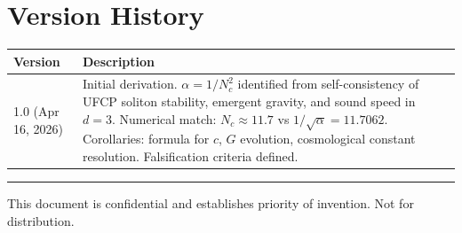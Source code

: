 \documentclass[11pt, a4paper]{article}
\begin{document}
\section{Version History}

\begin{center}
\begin{tabular}{@{}lp{10.5cm}@{}}
\toprule
\textbf{Version} & \textbf{Description} \\
\midrule
1.0 (Apr 16, 2026) & Initial derivation. $\alpha = 1/N_c^2$
  identified from self-consistency of UFCP soliton stability,
  emergent gravity, and sound speed in $d = 3$. Numerical
  match: $N_c \approx 11.7$ vs $1/\sqrt{\alpha} = 11.7062$.
  Corollaries: formula for $c$, $G$ evolution, cosmological
  constant resolution. Falsification criteria defined. \\
\bottomrule
\end{tabular}
\end{center}

\vspace{2em}
\hrule
\vspace{0.5em}
{\color{nm-gray}\small This document is confidential and
establishes priority of invention. Not for distribution.}
\end{document}
